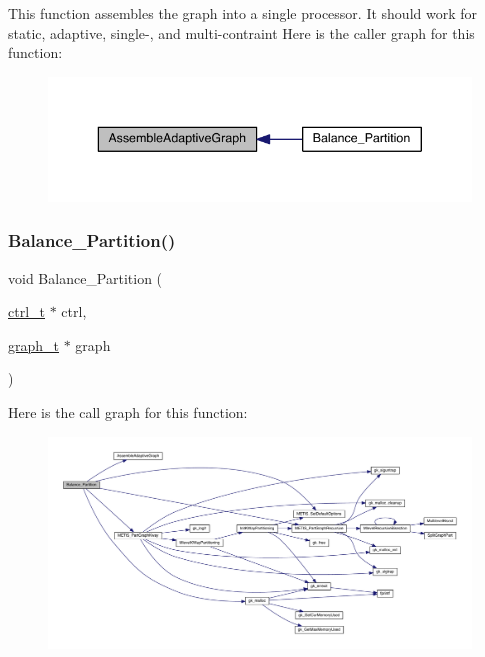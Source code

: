 This function assembles the graph into a single processor. It should work for static, adaptive, single-\/, and multi-\/contraint Here is the caller graph for this function\+:\nopagebreak
\begin{figure}[H]
\begin{center}
\leavevmode
\includegraphics[width=340pt]{a00362_a1bf0cf66702bc4f8de2149340294318b_icgraph}
\end{center}
\end{figure}
\mbox{\label{a00362_a7bcdd85a474ca202b55107b892a663f9}} 
\subsubsection{\texorpdfstring{Balance\+\_\+\+Partition()}{Balance\_Partition()}}
{\footnotesize\ttfamily void Balance\+\_\+\+Partition (\begin{DoxyParamCaption}\item[{\hyperlink{a00742}{ctrl\+\_\+t} $\ast$}]{ctrl,  }\item[{\hyperlink{a00734}{graph\+\_\+t} $\ast$}]{graph }\end{DoxyParamCaption})}

Here is the call graph for this function\+:\nopagebreak
\begin{figure}[H]
\begin{center}
\leavevmode
\includegraphics[width=350pt]{a00362_a7bcdd85a474ca202b55107b892a663f9_cgraph}
\end{center}
\end{figure}
